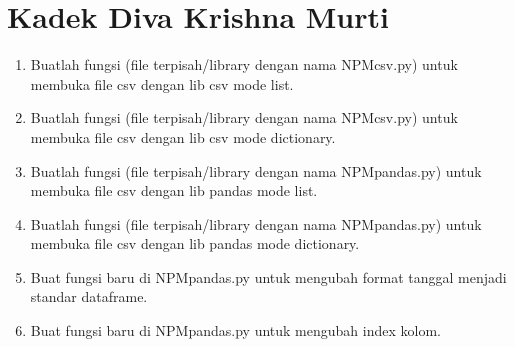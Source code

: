 
\section{Kadek Diva Krishna Murti}
\begin{enumerate}
	\item Buatlah  fungsi  (file  terpisah/library  dengan  nama  NPMcsv.py)  untuk  membuka file csv dengan lib csv mode list.
	
	
	
	\item Buatlah  fungsi  (file  terpisah/library  dengan  nama  NPMcsv.py)  untuk  membuka file csv dengan lib csv mode dictionary.
	
	
	
	\item Buatlah fungsi (file terpisah/library dengan nama NPMpandas.py) untuk membuka file csv dengan lib pandas mode list.
	
	
	
	\item Buatlah fungsi (file terpisah/library dengan nama NPMpandas.py) untuk membuka file csv dengan lib pandas mode dictionary.
	
	
	
	\item  Buat fungsi baru di NPMpandas.py untuk mengubah format tanggal menjadi standar dataframe.
	
	
	
	\item Buat fungsi baru di NPMpandas.py untuk mengubah index kolom.
	
	
	

\end{enumerate}
